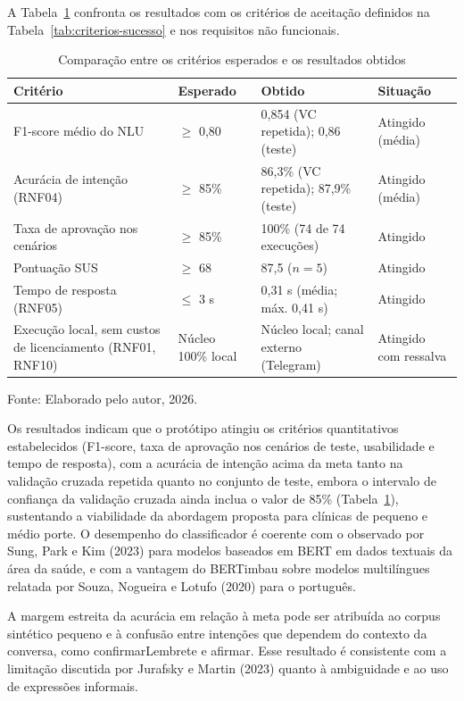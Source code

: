 \documentclass[12pt,a4paper]{extarticle}
\begin{document}
A Tabela~\ref{tab:esperado_obtido} confronta os resultados com os critérios de aceitação definidos na Tabela~\ref{tab:criterios-sucesso} e nos requisitos não funcionais.

\begin{table}[H]
\centering
\caption{Comparação entre os critérios esperados e os resultados obtidos}
\label{tab:esperado_obtido}
\begin{tabular}{p{4.6cm}p{2.8cm}p{2.6cm}p{2.4cm}}
\hline
\textbf{Critério} & \textbf{Esperado} & \textbf{Obtido} & \textbf{Situação} \\
\hline
F1-score médio do NLU & $\geq$ 0,80 & 0,854 (VC repetida); 0,86 (teste) & Atingido (média) \\
Acurácia de intenção (RNF04) & $\geq$ 85\% & 86,3\% (VC repetida); 87,9\% (teste) & Atingido (média) \\
Taxa de aprovação nos cenários & $\geq$ 85\% & 100\% (74 de 74 execuções) & Atingido \\
Pontuação SUS & $\geq$ 68 & 87,5 ($n = 5$) & Atingido \\
Tempo de resposta (RNF05) & $\leq$ 3 s & 0,31 s (média; máx. 0,41 s) & Atingido \\
Execução local, sem custos de licenciamento (RNF01, RNF10) & Núcleo 100\% local & Núcleo local; canal externo (Telegram) & Atingido com ressalva \\
\hline
\end{tabular}
\vspace{0.3cm}

\footnotesize{Fonte: Elaborado pelo autor, 2026.}
\end{table}

Os resultados indicam que o protótipo atingiu os critérios quantitativos estabelecidos (F1-score, taxa de aprovação nos cenários de teste, usabilidade e tempo de resposta), com a acurácia de intenção acima da meta tanto na validação cruzada repetida quanto no conjunto de teste, embora o intervalo de confiança da validação cruzada ainda inclua o valor de 85\% (Tabela~\ref{tab:esperado_obtido}), sustentando a viabilidade da abordagem proposta para clínicas de pequeno e médio porte. O desempenho do classificador é coerente com o observado por Sung, Park e Kim (2023) para modelos baseados em BERT em dados textuais da área da saúde, e com a vantagem do BERTimbau sobre modelos multilíngues relatada por Souza, Nogueira e Lotufo (2020) para o português.

A margem estreita da acurácia em relação à meta pode ser atribuída ao corpus sintético pequeno e à confusão entre intenções que dependem do contexto da conversa, como confirmarLembrete e afirmar. Esse resultado é consistente com a limitação discutida por Jurafsky e Martin (2023) quanto à ambiguidade e ao uso de expressões informais.
\end{document}
